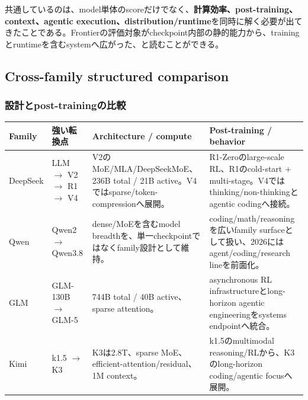 \documentclass[lualatex,a4paper,10pt]{jlreq}
\begin{document}
共通しているのは、model単体のscoreだけでなく、\textbf{計算効率、post-training、context、agentic execution、distribution/runtime}を同時に解く必要が出てきたことである。Frontierの評価対象がcheckpoint内部の静的能力から、trainingとruntimeを含むsystemへ広がった、と読むことができる。

\subsection{Cross-family structured comparison}
\subsubsection*{設計とpost-trainingの比較}
\small
\setlength{\tabcolsep}{3pt}
\begin{tabularx}{\textwidth}{@{}>{\raggedright\arraybackslash}p{}>{\raggedright\arraybackslash}p{}>{\raggedright\arraybackslash}p{}>{\raggedright\arraybackslash}X@{}}
\toprule
Family & 強い転換点 & Architecture / compute & Post-training / behavior \\
\midrule
DeepSeek & LLM $\rightarrow$ V2 $\rightarrow$ R1 $\rightarrow$ V4 & V2のMoE/MLA/DeepSeekMoE、236B total / 21B active。V4ではsparse/token-compressionへ展開。 & R1-Zeroのlarge-scale RL、R1のcold-start + multi-stage。V4ではthinking/non-thinkingとagentic codingへ接続。 \\
Qwen & Qwen2 $\rightarrow$ Qwen3.8 & dense/MoEを含むmodel breadthを、単一checkpointではなくfamily設計として維持。 & coding/math/reasoningを広いfamily surfaceとして扱い、2026にはagent/coding/research lineを前面化。 \\
GLM & GLM-130B $\rightarrow$ GLM-5 & 744B total / 40B active、sparse attention。 & asynchronous RL infrastructureとlong-horizon agentic engineeringをsystems endpointへ統合。 \\
Kimi & k1.5 $\rightarrow$ K3 & K3は2.8T、sparse MoE、efficient-attention/residual、1M context。 & k1.5のmultimodal reasoning/RLから、K3のlong-horizon coding/agentic focusへ展開。 \\
\bottomrule
\end{tabularx}
\normalsize
\end{document}
